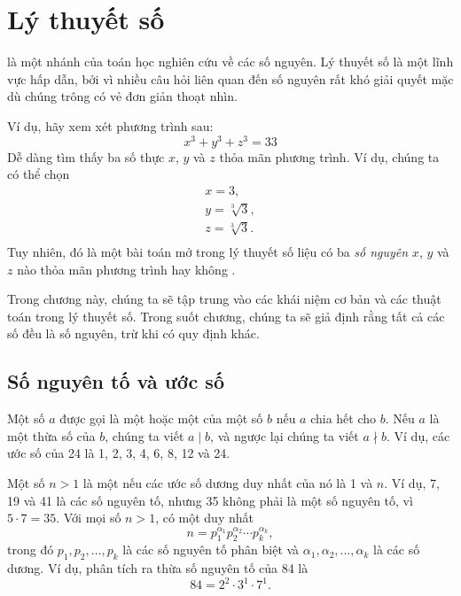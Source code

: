 \chapter{Lý thuyết số}


 là một nhánh của toán học
nghiên cứu về các số nguyên.
Lý thuyết số là một lĩnh vực hấp dẫn,
bởi vì nhiều câu hỏi liên quan đến số nguyên
rất khó giải quyết mặc dù chúng
trông có vẻ đơn giản thoạt nhìn.

Ví dụ, hãy xem xét phương trình sau:
\[x^3 + y^3 + z^3 = 33\]
Dễ dàng tìm thấy ba số thực $x$, $y$ và $z$
thỏa mãn phương trình.
Ví dụ, chúng ta có thể chọn
\[
\begin{array}{lcl}
x = 3, \\
y = \sqrt[3]{3}, \\
z = \sqrt[3]{3}.\\
\end{array}
\]
Tuy nhiên, đó là một bài toán mở trong lý thuyết số
liệu có ba
\emph{số nguyên} $x$, $y$ và $z$ nào
thỏa mãn phương trình hay không \cite{bec07}.

Trong chương này, chúng ta sẽ tập trung vào các khái niệm cơ bản
và các thuật toán trong lý thuyết số.
Trong suốt chương, chúng ta sẽ giả định rằng tất cả các số
đều là số nguyên, trừ khi có quy định khác.

\section{Số nguyên tố và ước số}


Một số $a$ được gọi là một  hoặc một  của một số $b$
nếu $a$ chia hết cho $b$.
Nếu $a$ là một thừa số của $b$,
chúng ta viết $a \mid b$, và ngược lại chúng ta viết $a \nmid b$.
Ví dụ, các ước số của 24 là
1, 2, 3, 4, 6, 8, 12 và 24.


Một số $n>1$ là một 
nếu các ước số dương duy nhất của nó là 1 và $n$.
Ví dụ, 7, 19 và 41 là các số nguyên tố,
nhưng 35 không phải là một số nguyên tố, vì $5 \cdot 7 = 35$.
Với mọi số $n>1$, có một
 duy nhất
\[ n = p_1^{\alpha_1} p_2^{\alpha_2} \cdots p_k^{\alpha_k},\]
trong đó $p_1,p_2,\ldots,p_k$ là các số nguyên tố phân biệt và
$\alpha_1,\alpha_2,\ldots,\alpha_k$ là các số dương.
Ví dụ, phân tích ra thừa số nguyên tố của 84 là
\[84 = 2^2 \cdot 3^1 \cdot 7^1.\]

